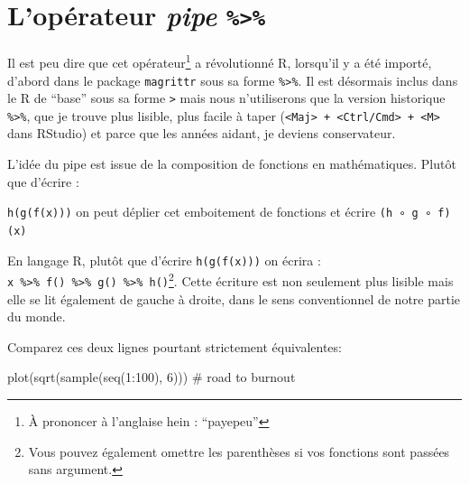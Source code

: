\documentclass[
  letterpaper,
  DIV=11,
  numbers=noendperiod]{scrreprt}
\newenvironment{Shaded}{\begin{snugshade}}{\end{snugshade}}
\newcommand{\CommentTok}[1]{\textcolor[rgb]{0.37,0.37,0.37}{#1}}
\newcommand{\DecValTok}[1]{\textcolor[rgb]{0.68,0.00,0.00}{#1}}
\newcommand{\FunctionTok}[1]{\textcolor[rgb]{0.28,0.35,0.67}{#1}}
\newcommand{\NormalTok}[1]{\textcolor[rgb]{0.00,0.23,0.31}{#1}}
\newcommand{\SpecialCharTok}[1]{\textcolor[rgb]{0.37,0.37,0.37}{#1}}
\begin{document}
\hypertarget{lopuxe9rateur-pipe}{%
\section{\texorpdfstring{L'opérateur \emph{pipe}
\texttt{\%\textgreater{}\%}}{L'opérateur pipe \%\textgreater\%}}\label{lopuxe9rateur-pipe}}

Il est peu dire que cet opérateur\footnote{À prononcer à l'anglaise hein
  : ``payepeu''} a révolutionné R, lorsqu'il y a été importé, d'abord
dans le package \texttt{magrittr} sous sa forme
\texttt{\%\textgreater{}\%}. Il est désormais inclus dans le R de
``base'' sous sa forme \texttt{\textbar{}\textgreater{}} mais nous
n'utiliserons que la version historique \texttt{\%\textgreater{}\%}, que
je trouve plus lisible, plus facile à taper
(\texttt{\textless{}Maj\textgreater{}\ +\ \textless{}Ctrl/Cmd\textgreater{}\ +\ \textless{}M\textgreater{}}
dans RStudio) et parce que les années aidant, je deviens conservateur.

L'idée du pipe est issue de la composition de fonctions en
mathématiques. Plutôt que d'écrire :

\texttt{h(g(f(x)))} on peut déplier cet emboitement de fonctions et
écrire \texttt{(h\ ∘\ g\ ∘\ f)(x)}

En langage R, plutôt que d'écrire \texttt{h(g(f(x)))} on écrira :
\texttt{x\ \%\textgreater{}\%\ f()\ \%\textgreater{}\%\ g()\ \%\textgreater{}\%\ h()}\footnote{Vous
  pouvez également omettre les parenthèses si vos fonctions sont passées
  sans argument.}. Cette écriture est non seulement plus lisible mais
elle se lit également de gauche à droite, dans le sens conventionnel de
notre partie du monde.

Comparez ces deux lignes pourtant strictement équivalentes:

\begin{Shaded}
\begin{Highlighting}[]
\FunctionTok{plot}\NormalTok{(}\FunctionTok{sqrt}\NormalTok{(}\FunctionTok{sample}\NormalTok{(}\FunctionTok{seq}\NormalTok{(}\DecValTok{1}\SpecialCharTok{:}\DecValTok{100}\NormalTok{), }\DecValTok{6}\NormalTok{)))              }\CommentTok{\# road to burnout}
\end{Highlighting}
\end{Shaded}
\end{document}
